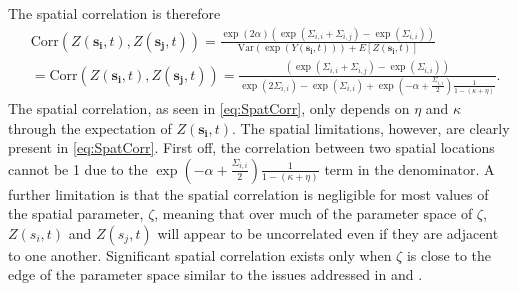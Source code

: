 \documentclass[11pt]{isuthesis}
\begin{document}
The spatial correlation is therefore
\begin{align}
	& \mbox{Corr}(Z(\boldsymbol{s_i},t),Z(\boldsymbol{s_j},t))  = \frac{\exp(2\alpha)\left(\exp(\Sigma_{i,i}+\Sigma_{i,j}) -\exp(\Sigma_{i,i})\right)}{\mbox{Var} (\exp(Y(\boldsymbol{s_i},t)))+E[Z(\boldsymbol{s_i},t)]}\nonumber \\
	&=\mbox{Corr}(Z(\boldsymbol{s_i},t),Z(\boldsymbol{s_j},t))  = \frac{\left(\exp(\Sigma_{i,i}+\Sigma_{i,j}) -\exp(\Sigma_{i,i})\right)}{ \exp(2\Sigma_{i,i})-\exp(\Sigma_{i,i})+\exp(-\alpha+\frac{\Sigma_{i,i}}{2})\frac{1}{1-(\kappa+\eta)}}\label{eq:SpatCorr}.
\end{align}
The spatial correlation, as seen in \eqref{eq:SpatCorr}, only depends on $\eta$ and $\kappa$ through the expectation of $Z(\boldsymbol{s_i},t)$.  The spatial limitations, however, are clearly present in \eqref{eq:SpatCorr}.  First off, the correlation between two spatial locations cannot be 1 due to the $\exp(-\alpha+\frac{\Sigma_{i,i}}{2})\frac{1}{1-(\kappa+\eta)}$ term in the denominator.  A further limitation is that the spatial correlation is negligible for most values of the spatial parameter, $\zeta$, meaning that over much of the parameter space of $\zeta$, $Z(s_i,t)$ and $Z(s_j,t)$ will appear to be uncorrelated even if they are adjacent to one another.  Significant spatial correlation exists only when $\zeta$ is close to the edge of the parameter space similar to the issues addressed in \cite{besag1981system} and \cite{wall2004close}.
\end{document}
